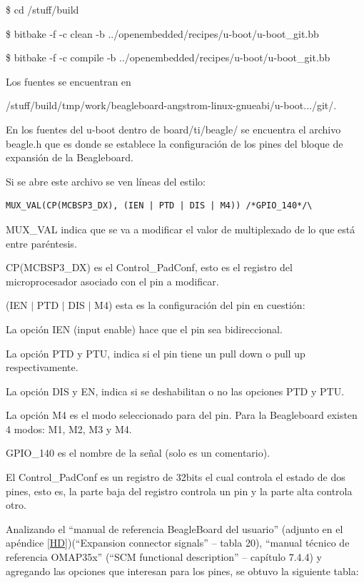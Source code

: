 \centerline{\$ cd /stuff/build}

\centerline{\$ bitbake -f -c clean -b ../openembedded/recipes/u-boot/u-boot\_git.bb}

\centerline{\$ bitbake -f -c compile -b ../openembedded/recipes/u-boot/u-boot\_git.bb}

\bigskip
Los fuentes se encuentran en 

/stuff/build/tmp/work/beagleboard-angstrom-linux-gnueabi/u-boot.../git/.

\bigskip
En los fuentes del u-boot dentro de board/ti/beagle/ se encuentra el archivo beagle.h que es donde se establece la configuración de los pines del bloque de expansión de la Beagleboard.

Si se abre este archivo se ven líneas del estilo: 

\begin{verbatim}
MUX_VAL(CP(MCBSP3_DX), (IEN | PTD | DIS | M4)) /*GPIO_140*/\
\end{verbatim}

MUX\_VAL indica que se va a modificar el valor de multiplexado de lo que está entre paréntesis. 

\bigskip
CP(MCBSP3\_DX) es el Control\_PadConf, esto es el registro del microprocesador asociado con el 
pin a modificar. 

\bigskip
(IEN $|$ PTD $|$ DIS $|$ M4) esta es la configuración del pin en cuestión: 


La opción IEN (input enable) hace que el pin sea bidireccional. 

La opción PTD y PTU, indica si el pin tiene un pull down o pull up respectivamente. 

La opción DIS y EN, indica si se deshabilitan o no las opciones PTD y PTU. 

La opción M4 es el modo seleccionado para del pin. Para la Beagleboard existen 4 modos: M1, M2, M3 y M4.

GPIO\_140 es el nombre de la señal (solo es un comentario). 

\bigskip
El Control\_PadConf es un registro de 32bits el cual controla el estado de dos pines, esto es, la parte 
baja del registro controla un pin y la parte alta controla otro. 

\bigskip
Analizando el “manual de referencia BeagleBoard del usuario” (adjunto en el apéndice \ref{HD})(“Expansion connector signals” – tabla 20), “manual técnico de referencia OMAP35x” (“SCM functional description” – capítulo 7.4.4) y agregando las opciones que interesan para los pines, se obtuvo la siguiente tabla: 

